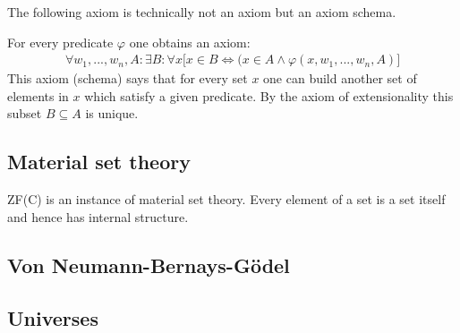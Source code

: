 	The following axiom is technically not an axiom but an axiom schema.
	\begin{axiom}[Specification]
		For every predicate $\varphi$ one obtains an axiom:
		\begin{gather}
			\forall w_1, ..., w_n, A:\exists B:\forall x\big[x\in B\iff(x\in A\land \varphi(x, w_1, ..., w_n, A)\big]
		\end{gather}
		This axiom (schema) says that for every set $x$ one can build another set of elements in $x$ which satisfy a given predicate. By the axiom of extensionality this subset $B\subseteq A$ is unique.
	\end{axiom}

\subsection{Material set theory}

	ZF(C) is an instance of material set theory. Every element of a set is a set itself and hence has internal structure.


\subsection{Von Neumann-Bernays-G\"odel}

\subsection{Universes}


